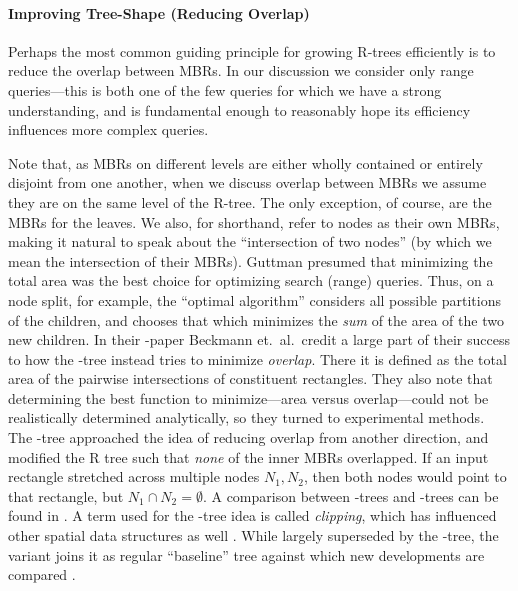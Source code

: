 
\paragraph{Improving Tree-Shape (Reducing Overlap)}
Perhaps the most common guiding principle for growing R-trees efficiently is to reduce the overlap between MBRs.
In our discussion we consider only range queries---this is both one of the few queries for which we have a strong understanding, and is fundamental enough to reasonably hope its efficiency influences more complex queries.

Note that, as MBRs on different levels are either wholly contained or entirely disjoint from one another, when we discuss overlap between MBRs we assume they are on the same level of the R-tree.
The only exception, of course, are the MBRs for the leaves.
We also, for shorthand, refer to nodes as their own MBRs, making it natural to speak about the ``intersection of two nodes'' (by which we mean the intersection of their MBRs).
Guttman \cite{guttman84} presumed that minimizing the total area was the best choice for optimizing search (range) queries.
Thus, on a node split, for example, the ``optimal algorithm'' considers all possible partitions of the children, and chooses that which minimizes the \emph{sum} of the area of the two new children.
In their \rstar-paper \cite{beckmannkriegelschneiderseeger90} Beckmann et.\ al.\ credit a large part of their success to how the \rstar-tree instead tries to minimize \emph{overlap}.
There it is defined as the total area of the pairwise intersections of constituent rectangles.
They also note that determining the best function to minimize---area versus overlap---could not be realistically determined analytically, so they turned to experimental methods.
The \rplus-tree \cite{sellisroussopoulosfaloutsos87} approached the idea of reducing overlap from another direction, and modified the R tree such that \emph{none} of the inner MBRs overlapped.
If an input rectangle stretched across multiple nodes $N_1,N_2$, then both nodes would point to that rectangle, but $N_1\cap N_2=\emptyset$.
A comparison between \rbase-trees and \rplus-trees can be found in \cite{greene89}.
A term used for the \rplus-tree idea is called \emph{clipping}, which has influenced other spatial data structures as well \cite{gaedegunther98}.
While largely superseded by the \rstar-tree, the \rplus variant joins it as regular ``baseline'' tree against which new developments are compared \cite{tocite}.

